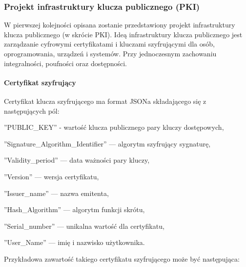 	\subsubsection{Projekt infrastruktury klucza publicznego (PKI)}\label{sec:Projekt PKI}
	W pierwszej kolejności opisana zostanie przedstawiony projekt infrastruktury klucza publicznego (w skrócie PKI). Ideą infrastruktury klucza publicznego jest zarządzanie cyfrowymi certyfikatami i kluczami szyfrującymi dla osób, oprogramowania, urządzeń i systemów. Przy jednoczesnym zachowaniu integralności, poufności oraz dostępności.
		\paragraph*{Certyfikat szyfrujący}
		Certyfikat klucza szyfrującego ma format JSONa składającego się z następujących pól:
		\begin{itemize*}
			\item ''PUBLIC\_KEY” - wartość klucza publicznego pary kluczy dostępowych,
			\item ''Signature\_Algorithm\_Identifier'' --- algorytm szyfrujący sygnaturę,
			\item ''Validity\_period'' --- data ważności pary kluczy,
			\item ''Version'' --- wersja certyfikatu,
			\item ''Issuer\_name'' --- nazwa emitenta,
			\item ''Hash\_Algorithm'' --- algorytm funkcji skrótu,
			\item ''Serial\_number'' --- unikalna wartość dla certyfikatu,
			\item ''User\_Name'' --- imię i nazwisko użytkownika.
		\end{itemize*}
	\newpage
		Przykładowa zawartość takiego certyfikatu szyfrującego może być następująca:\\
